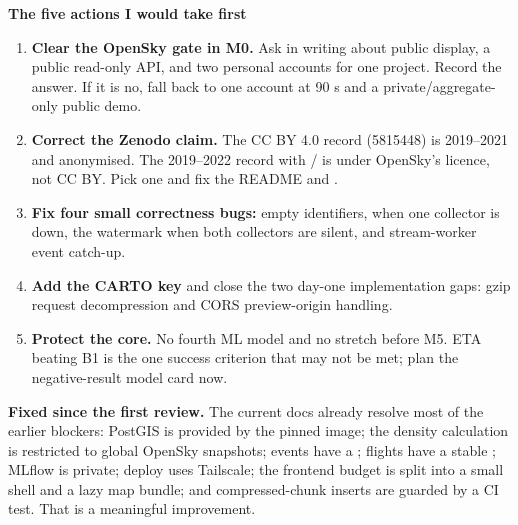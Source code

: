 \documentclass[10.5pt]{article}
\begin{document}
\vspace{4pt}
\begin{accentcard}
{\bfseries The five actions I would take first}
\begin{enumerate}[leftmargin=1.25em,itemsep=2pt,topsep=2pt]
  \item \textbf{Clear the OpenSky gate in M0.} Ask in writing about public display, a public read-only API, and two personal accounts for one project. Record the answer. If it is no, fall back to one account at 90 s and a private/aggregate-only public demo.
  \item \textbf{Correct the Zenodo claim.} The CC BY 4.0 record (5815448) is 2019--2021 and anonymised. The 2019--2022 record with / is under OpenSky's licence, not CC BY. Pick one and fix the README and .
  \item \textbf{Fix four small correctness bugs:}  empty identifiers,  when one collector is down, the watermark when both collectors are silent, and stream-worker event catch-up.
  \item \textbf{Add the CARTO key} and close the two day-one implementation gaps: gzip request decompression and CORS preview-origin handling.
  \item \textbf{Protect the core.} No fourth ML model and no stretch before M5. ETA beating B1 is the one success criterion that may not be met; plan the negative-result model card now.
\end{enumerate}
\end{accentcard}

\vspace{4pt}
\begin{softcard}
{\bfseries Fixed since the first review.} The current docs already resolve most of the earlier blockers: PostGIS is provided by the pinned  image; the density calculation is restricted to global OpenSky snapshots; events have a ; flights have a stable ; MLflow is private; deploy uses Tailscale; the frontend budget is split into a small shell and a lazy map bundle; and compressed-chunk inserts are guarded by a CI test. That is a meaningful improvement.
\end{softcard}

\end{document}
